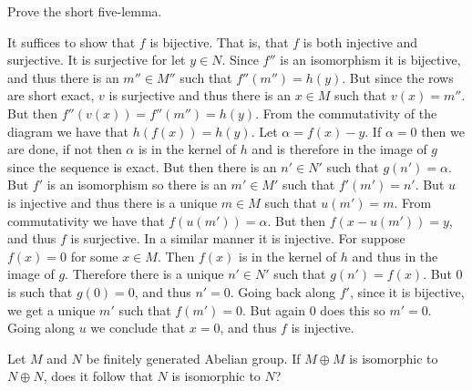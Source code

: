 \documentclass[crop=false,class=article]{standalone}                           %
\begin{document}
        \begin{problem}
            Prove the short five-lemma.
        \end{problem}
        \begin{solution}
            It suffices to show that $f$ is bijective. That is, that $f$ is both
            injective and surjective. It is surjective for let $y\in{N}$. Since
            $f''$ is an isomorphism it is bijective, and thus there is an
            $m''\in{M}''$ such that $f''(m'')=h(y)$. But since the rows are
            short exact, $v$ is surjective and thus there is an $x\in{M}$ such
            that $v(x)=m''$. But then $f''(v(x))=f''(m'')=h(y)$. From the
            commutativity of the diagram we have that $h(f(x))=h(y)$. Let
            $\alpha=f(x)-y$. If $\alpha=0$ then we are done, if not then
            $\alpha$ is in the kernel of $h$ and is therefore in the image of
            $g$ since the sequence is exact. But then there is an $n'\in{N}'$
            such that $g(n')=\alpha$. But $f'$ is an isomorphism so there is
            an $m'\in{M}'$ such that $f'(m')=n'$. But $u$ is injective and thus
            there is a unique $m\in{M}$ such that $u(m')=m$. From commutativity
            we have that $f(u(m'))=\alpha$. But then $f(x-u(m'))=y$, and thus
            $f$ is surjective. In a similar manner it is injective. For suppose
            $f(x)=0$ for some $x\in{M}$. Then $f(x)$ is in the kernel of $h$
            and thus in the image of $g$. Therefore there is a unique
            $n'\in{N}'$ such that $g(n')=f(x)$. But $0$ is such that $g(0)=0$,
            and thus $n'=0$. Going back along $f'$, since it is bijective, we
            get a unique $m'$ such that $f(m')=0$. But again $0$ does this so
            $m'=0$. Going along $u$ we conclude that $x=0$, and thus $f$ is
            injective.
        \end{solution}
        \begin{problem}
            Let $M$ and $N$ be finitely generated Abelian group. If $M\oplus{M}$
            is isomorphic to $N\oplus{N}$, does it follow that $N$ is isomorphic
            to $N$?
        \end{problem}
\end{document}
